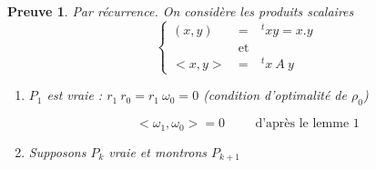 \documentclass[a4paper,11pt]{article}
\newcommand{\tpo}[1]{\,^t#1}
\theoremstyle{plain} %
\newtheorem{preuve}{Preuve}
\begin{document}
\begin{preuve}
    Par récurrence. On considère les produits scalaires 
    \[
        \left\lbrace
        \begin{array}{ccc}
            (x,y) & = & \tpo xy = x.y \\
            & \text{et} & \\
            <x,y> \: & = & \tpo x \: A \: y
        \end{array}
        \right.
    \]

    \begin{enumerate}[label=•]
        \item $P_1$ est vraie : $r_1 \: r_0 = r_1 \: \omega_0 = 0$ (condition d'optimalité de $\rho_0$)

            \[
                < \omega_1 , \omega_0 > = 0 \hspace{1cm} \text{d'après le lemme 1}
            \]

        \item Supposons $P_k$ vraie et montrons $P_{k+1}$
    \end{enumerate}
\end{preuve}
\end{document}
